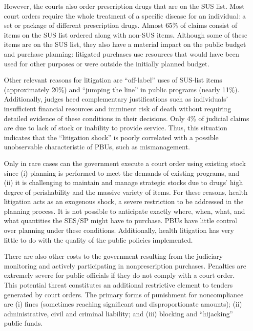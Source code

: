 However, the courts also order prescription drugs that are on the SUS list. Most court orders require the whole treatment of a specific disease for an individual: a set or package of different prescription drugs. Almost 65\% of claims consist of items on the SUS list ordered along with non-SUS items. Although some of these items are on the SUS list, they also have a material impact on the public budget and purchase planning: litigated purchases use resources that would have been used for other purposes or were outside the initially planned budget.

Other relevant reasons for litigation are “off-label” uses of SUS-list items (approximately 20\%) and “jumping the line” in public programs (nearly 11\%). Additionally, judges heed complementary justifications such as individuals’ insufficient financial resources and imminent risk of death without requiring detailed evidence of these conditions in their decisions. Only 4\% of judicial claims are due to lack of stock or inability to provide service. Thus, this situation indicates that the “litigation shock” is poorly correlated with a possible unobservable characteristic of PBUs, such as mismanagement.

Only in rare cases can the government execute a court order using existing stock since (i) planning is performed to meet the demands of existing programs, and (ii) it is challenging to maintain and manage strategic stocks due to drugs’ high degree of perishability and the massive variety of items. For these reasons, health litigation acts as an exogenous shock, a severe restriction to be addressed in the planning process. It is not possible to anticipate exactly where, when, what, and what quantities the SES/SP might have to purchase. PBUs have little control over planning under these conditions. Additionally, health litigation has very little to do with the quality of the public policies implemented.

There are also other costs to the government resulting from the judiciary monitoring and actively participating in nonprescription purchases. Penalties are extremely severe for public officials if they do not comply with a court order. This potential threat constitutes an additional restrictive element to tenders generated by court orders. The primary forms of punishment for noncompliance are (i) fines (sometimes reaching significant and disproportionate amounts); (ii) administrative, civil and criminal liability; and (iii) blocking and “hijacking” public funds.

